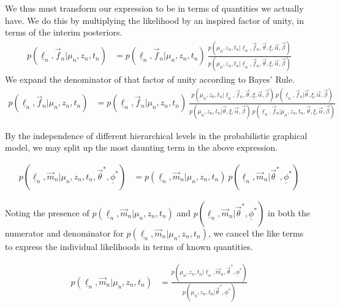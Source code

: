 \documentclass[12pt, onecolumn]{emulateapj}
\newcommand{\textul}{\underline}
\begin{document}
We thus must transform our expression to be in terms of quantities we actually have.  We do this by multiplying the likelihood by an inspired factor of unity, in terms of the interim posteriors.
\begin{align}
\label{eq:unity}
p(\textul{\ell}_{n}, \vec{f}_{n} | \mu_{n}, z_{n}, t_{n}) &= p(\textul{\ell}_{n}, \vec{f}_{n} | \mu_{n}, z_{n}, t_{n})\ \frac{p(\mu_{n}, z_{n}, t_{n} | \textul{\ell}_{n}, \vec{f}_{n},\vec{\theta}, \textul{\xi}, \vec{\alpha}, \vec{\beta})}{p(\mu_{n}, z_{n}, t_{n} | \textul{\ell}_{n}, \vec{f}_{n}, \vec{\theta}, \textul{\xi}, \vec{\alpha}, \vec{\beta})}
\end{align}
We expand the denominator of that factor of unity according to Bayes' Rule.
\begin{align}
\label{eq:expand}
p(\textul{\ell}_{n}, \vec{f}_{n} | \mu_{n}, z_{n}, t_{n}) &= p(\textul{\ell}_{n}, \vec{f}_{n} | \mu_{n}, z_{n}, t_{n})\ \frac{p(\mu_{n}, z_{n}, t_{n} | \textul{\ell}_{n}, \vec{f}_{n},\vec{\theta}, \textul{\xi}, \vec{\alpha}, \vec{\beta})\ p(\textul{\ell}_{n}, \vec{f}_{n} | \vec{\theta}, \textul{\xi}, \vec{\alpha}, \vec{\beta})}{p(\mu_{n}, z_{n}, t_{n} | \vec{\theta}, \textul{\xi}, \vec{\alpha}, \vec{\beta})\ p(\textul{\ell}_{n}, \vec{f}_{n} | \mu_{n}, z_{n}, t_{n}, \vec{\theta}, \textul{\xi}, \vec{\alpha}, \vec{\beta})}
\end{align}

By the independence of different hierarchical levels in the probabilistic graphical model, we may split up the most daunting term in the above expression.

\begin{align}
p(\textul{\ell}_{n}, \vec{m}_{n} | \mu_{n}, z_{n}, t_{n}, \vec{\theta}^{*}, \textul{\phi}^{*}) &= p(\textul{\ell}_{n}, \vec{m}_{n} | \mu_{n}, z_{n}, t_{n})\ p(\textul{\ell}_{n}, \vec{m}_{n} | \vec{\theta}^{*}, \textul{\phi}^{*})
\end{align}

Noting the presence of $p(\textul{\ell}_{n}, \vec{m}_{n} | \mu_{n}, z_{n}, t_{n})$ and $p(\textul{\ell}_{n}, \vec{m}_{n} | \vec{\theta}^{*}, \textul{\phi}^{*})$ in both the numerator and denominator for $p(\textul{\ell}_{n}, \vec{m}_{n} | \mu_{n}, z_{n}, t_{n})$, we cancel the like terms to express the individual likelihoods in terms of known quantities.

\begin{align}
p(\textul{\ell}_{n}, \vec{m}_{n} | \mu_{n}, z_{n}, t_{n}) &= \frac{p(\mu_{n}, z_{n}, t_{n} | \textul{\ell}_{n}, \vec{m}_{n}, \vec{\theta}^{*}, \textul{\phi}^{*})}{p(\mu_{n}, z_{n}, t_{n} | \vec{\theta}^{*}, \textul{\phi}^{*})}
\end{align}
\end{document}
